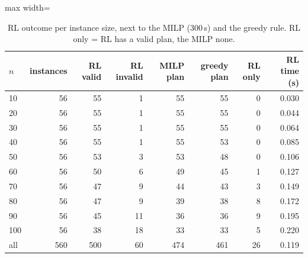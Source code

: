 \begin{table}[H]\centering
\caption{RL outcome per instance size, next to the MILP (300\,s) and the greedy rule. RL only = RL has a valid plan, the MILP none.}\label{tab:outcome}
\begin{adjustbox}{max width=\textwidth}\begin{tabular}{lrrrrrrr}\toprule
$n$ & instances & RL valid & RL invalid & MILP plan & greedy plan & RL only & RL time (s) \\ \midrule
10 & 56 & 55 & 1 & 55 & 55 & 0 & 0.030 \\
20 & 56 & 55 & 1 & 55 & 55 & 0 & 0.044 \\
30 & 56 & 55 & 1 & 55 & 55 & 0 & 0.064 \\
40 & 56 & 55 & 1 & 55 & 53 & 0 & 0.085 \\
50 & 56 & 53 & 3 & 53 & 48 & 0 & 0.106 \\
60 & 56 & 50 & 6 & 49 & 45 & 1 & 0.127 \\
70 & 56 & 47 & 9 & 44 & 43 & 3 & 0.149 \\
80 & 56 & 47 & 9 & 39 & 38 & 8 & 0.172 \\
90 & 56 & 45 & 11 & 36 & 36 & 9 & 0.195 \\
100 & 56 & 38 & 18 & 33 & 33 & 5 & 0.220 \\
\midrule all & 560 & 500 & 60 & 474 & 461 & 26 & 0.119 \\
\bottomrule\end{tabular}\end{adjustbox}\end{table}
